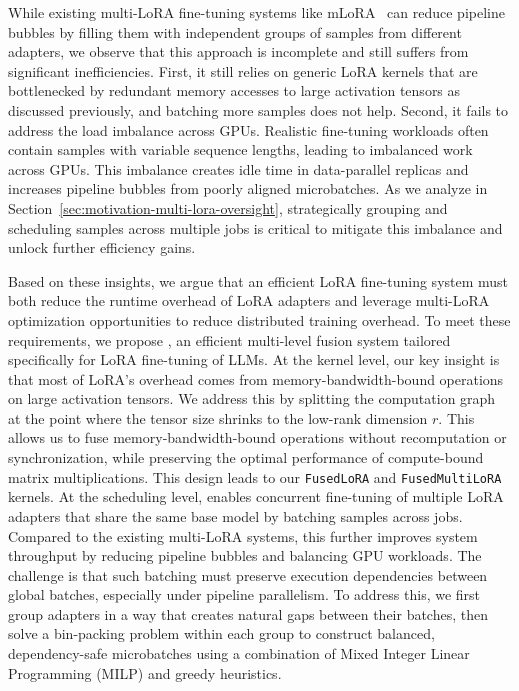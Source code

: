 \begin{sloppypar}
While existing multi-LoRA fine-tuning systems like mLoRA~\cite{ye2023mlora} can reduce pipeline bubbles by filling them with independent groups of samples from different adapters, we observe that this approach is incomplete and still suffers from significant inefficiencies.
First, it still relies on generic LoRA kernels that are bottlenecked by redundant memory accesses to large activation tensors as discussed previously, and batching more samples does not help.
Second, it fails to address the load imbalance across GPUs.
Realistic fine-tuning workloads often contain samples with variable sequence lengths, leading to imbalanced work across GPUs.
This imbalance creates idle time in data-parallel replicas and increases pipeline bubbles from poorly aligned microbatches.
As we analyze in Section~\ref{sec:motivation-multi-lora-oversight}, strategically grouping and scheduling samples across multiple jobs is critical to mitigate this imbalance and unlock further efficiency gains.
\end{sloppypar}

Based on these insights, we argue that an efficient LoRA fine-tuning system must both reduce the runtime overhead of LoRA adapters and leverage multi-LoRA optimization opportunities to reduce distributed training overhead.
To meet these requirements, we propose \textit{\Name}, an efficient multi-level fusion system tailored specifically for LoRA fine-tuning of LLMs.
%
At the kernel level, our key insight is that most of LoRA's overhead comes from memory-bandwidth-bound operations on large activation tensors.
We address this by splitting the computation graph at the point where the tensor size shrinks to the low-rank dimension $r$.
This allows us to fuse memory-bandwidth-bound operations without recomputation or synchronization, while preserving the optimal performance of compute-bound matrix multiplications. 
This design leads to our \texttt{FusedLoRA} and \texttt{FusedMultiLoRA} kernels.
%
At the scheduling level, \Name enables concurrent fine-tuning of multiple LoRA adapters that share the same base model by batching samples across jobs.
Compared to the existing multi-LoRA systems, this further improves system throughput by reducing pipeline bubbles and balancing GPU workloads.
The challenge is that such batching must preserve execution dependencies between global batches, especially under pipeline parallelism.
To address this, we first group adapters in a way that creates natural gaps between their batches, then solve a bin-packing problem within each group to construct balanced, dependency-safe microbatches using a combination of Mixed Integer Linear Programming (MILP) and greedy heuristics.

